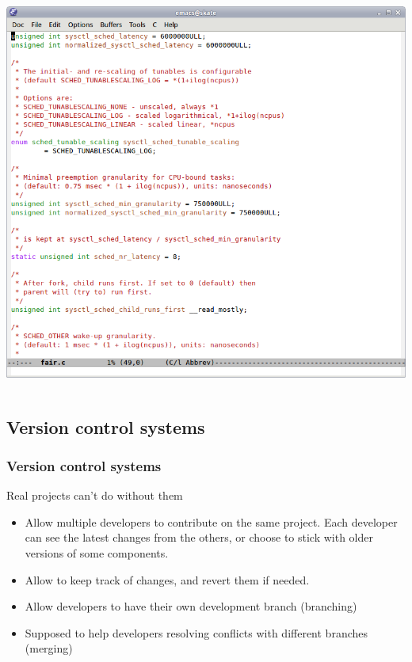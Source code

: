 \begin{frame}
\begin{columns}[T]
    \includegraphics[width=\textwidth]{slides/sysdev-application-development/emacs-screenshot.png}
  \end{columns}
\end{frame}

\subsection{Version control systems}

\begin{frame}
  \frametitle{Version control systems}
  Real projects can't do without them
  \begin{itemize}
  \item Allow multiple developers to contribute on the same
    project. Each developer can see the latest changes from the
    others, or choose to stick with older versions of some components.
  \item Allow to keep track of changes, and revert them if needed.
  \item Allow developers to have their own development branch
    (branching)
  \item Supposed to help developers resolving conflicts with different
    branches (merging)
  \end{itemize}
\end{frame}

